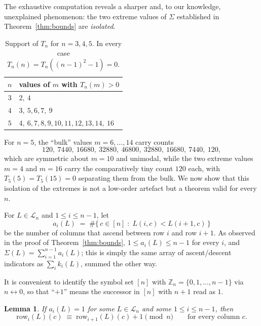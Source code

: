 \documentclass[11pt]{amsart}
\newtheorem{lemma}[theorem]{Lemma}
\begin{document}
The exhaustive computation reveals a sharper and, to our knowledge, unexplained phenomenon: the two extreme values of $\Sigma$ established in Theorem~\ref{thm:bounds} are \emph{isolated}.

\begin{table}[h]
\centering
\begin{tabular}{@{}c|l@{}}
\toprule
$n$ & values of $m$ with $T_n(m)>0$ \\
\midrule
$3$ & $2,\ 4$ \\
$4$ & $3,\ 5,6,7,\ 9$ \\
$5$ & $4,\ 6,7,8,9,10,11,12,13,14,\ 16$ \\
\bottomrule
\end{tabular}
\caption{Support of $T_n$ for $n=3,4,5$. In every case $T_n(n)=T_n((n-1)^2-1)=0$.}
\label{tab:gap}
\end{table}

For $n=5$, the ``bulk'' values $m=6,\dots,14$ carry counts
\[
120,\ 7440,\ 16680,\ 32880,\ 46800,\ 32880,\ 16680,\ 7440,\ 120,
\]
which are symmetric about $m=10$ and unimodal, while the two extreme values $m=4$ and $m=16$ carry the comparatively tiny count $120$ each, with $T_5(5)=T_5(15)=0$ separating them from the bulk. We now show that this isolation of the extremes is not a low-order artefact but a theorem valid for every $n$.

For $L\in\mathcal L_n$ and $1\le i\le n-1$, let
\[
a_i(L)\;=\;\#\{\,c\in[n]\;:\;L(i,c)<L(i+1,c)\,\}
\]
be the number of columns that ascend between row $i$ and row $i+1$. As observed in the proof of Theorem~\ref{thm:bounds}, $1\le a_i(L)\le n-1$ for every $i$, and $\Sigma(L)=\sum_{i=1}^{n-1}a_i(L)$; this is simply the same array of ascent/descent indicators as $\sum_i k_i(L)$, summed the other way.

It is convenient to identify the symbol set $[n]$ with $\mathbb Z_n=\{0,1,\dots,n-1\}$ via $n\leftrightarrow 0$, so that ``$+1$'' means the successor in $[n]$ with $n+1$ read as $1$.

\begin{lemma}\label{lem:rigid}
If $a_i(L)=1$ for some $L\in\mathcal L_n$ and some $1\le i\le n-1$, then
\[
\mathrm{row}_i(L)(c) \;\equiv\; \mathrm{row}_{i+1}(L)(c) + 1 \pmod n \qquad\text{for every column } c.
\]
\end{lemma}
\end{document}
